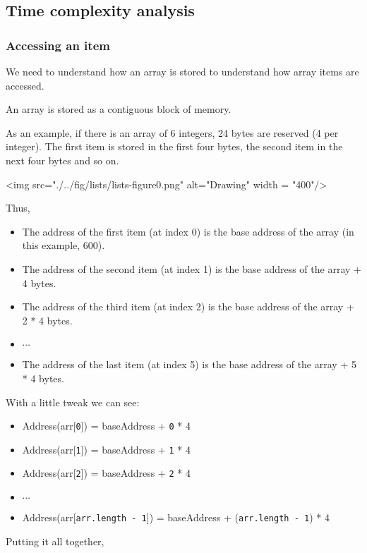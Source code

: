 \newpage

\subsection{Time complexity analysis}

\subsubsection{Accessing an item}

We need to understand how an array is stored to understand how array items are accessed.

An array is stored as a contiguous block of memory. 

As an example, if there is an array of 6 integers, 24 bytes are reserved (4 per integer). The first item is stored in the first four bytes, the second item in the next four bytes and so on.

<img src="./../fig/lists/lists-figure0.png" alt="Drawing" width = "400"/>

Thus,
\begin{itemize}
  \item The address of the first item (at index 0) is the base address of the array (in this example, 600).
  \item The address of the second item (at index 1) is the base address of the array + 4 bytes.
  \item The address of the third item (at index 2) is the base address of the array + 2 * 4 bytes.
  \item $\cdots$  
  \item The address of the last item (at index 5) is the base address of the array + 5 * 4 bytes.
\end{itemize}

With a little tweak we can see:

\begin{itemize}
  \item Address(arr[\texttt{0}]) = baseAddress + \texttt{0} * 4
  \item Address(arr[\texttt{1}]) = baseAddress + \texttt{1} * 4
  \item Address(arr[\texttt{2}]) = baseAddress + \texttt{2} * 4
  \item $\cdots$  
  \item Address(arr[\texttt{arr.length - 1}]) = baseAddress + (\texttt{arr.length - 1}) * 4
\end{itemize}

Putting it all together,

